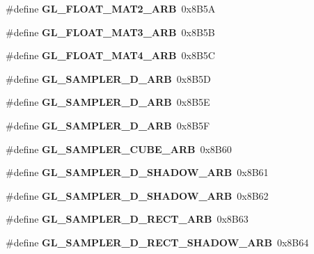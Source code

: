 \begin{DoxyCompactItemize}
\item 
\#define {\bfseries G\+L\+\_\+\+F\+L\+O\+A\+T\+\_\+\+M\+A\+T2\+\_\+\+A\+R\+B}~0x8\+B5\+A\label{_s_d_l__opengl_8h_a954efac55233f54d97a3c9f347d1bf03}

\item 
\#define {\bfseries G\+L\+\_\+\+F\+L\+O\+A\+T\+\_\+\+M\+A\+T3\+\_\+\+A\+R\+B}~0x8\+B5\+B\label{_s_d_l__opengl_8h_ab62d536f4a1c8baa740c7b0af2e50245}

\item 
\#define {\bfseries G\+L\+\_\+\+F\+L\+O\+A\+T\+\_\+\+M\+A\+T4\+\_\+\+A\+R\+B}~0x8\+B5\+C\label{_s_d_l__opengl_8h_a24145ee3e559eb4a0a41a3095bf23489}

\item 
\#define {\bfseries G\+L\+\_\+\+S\+A\+M\+P\+L\+E\+R\+\_\+D\+\_\+\+A\+R\+B}~0x8\+B5\+D\label{_s_d_l__opengl_8h_a41764a347e1ce667c3ccadef1c913e47}

\item 
\#define {\bfseries G\+L\+\_\+\+S\+A\+M\+P\+L\+E\+R\+\_\+D\+\_\+\+A\+R\+B}~0x8\+B5\+E\label{_s_d_l__opengl_8h_aa5e4f1857e102966af72357f26f23e69}

\item 
\#define {\bfseries G\+L\+\_\+\+S\+A\+M\+P\+L\+E\+R\+\_\+D\+\_\+\+A\+R\+B}~0x8\+B5\+F\label{_s_d_l__opengl_8h_a205f07f97238c524151f81b3ce97534a}

\item 
\#define {\bfseries G\+L\+\_\+\+S\+A\+M\+P\+L\+E\+R\+\_\+\+C\+U\+B\+E\+\_\+\+A\+R\+B}~0x8\+B60\label{_s_d_l__opengl_8h_a6c42683d7fe8fd657926645eb5f96c8a}

\item 
\#define {\bfseries G\+L\+\_\+\+S\+A\+M\+P\+L\+E\+R\+\_\+D\+\_\+\+S\+H\+A\+D\+O\+W\+\_\+\+A\+R\+B}~0x8\+B61\label{_s_d_l__opengl_8h_aa090f78b398c5bec41e8007fa01ac750}

\item 
\#define {\bfseries G\+L\+\_\+\+S\+A\+M\+P\+L\+E\+R\+\_\+D\+\_\+\+S\+H\+A\+D\+O\+W\+\_\+\+A\+R\+B}~0x8\+B62\label{_s_d_l__opengl_8h_a75c4dbe7bfc18f7a44bd6211fa868bb7}

\item 
\#define {\bfseries G\+L\+\_\+\+S\+A\+M\+P\+L\+E\+R\+\_\+D\+\_\+\+R\+E\+C\+T\+\_\+\+A\+R\+B}~0x8\+B63\label{_s_d_l__opengl_8h_aad6df9e9229dd5b3d827b329ecfd3a1d}

\item 
\#define {\bfseries G\+L\+\_\+\+S\+A\+M\+P\+L\+E\+R\+\_\+D\+\_\+\+R\+E\+C\+T\+\_\+\+S\+H\+A\+D\+O\+W\+\_\+\+A\+R\+B}~0x8\+B64\label{_s_d_l__opengl_8h_ac6276cc957c6eb10cf6d6cd528acf1c6}


\end{DoxyCompactItemize}
